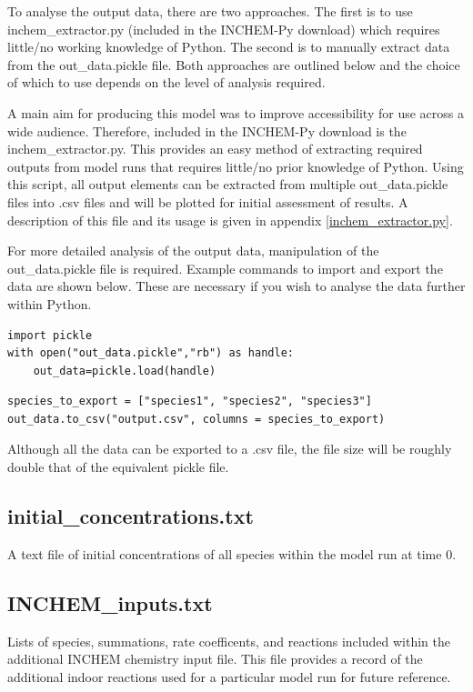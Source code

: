 \documentclass[a4paper]{refart}
\begin{document}
To analyse the output data, there are two approaches. The first is to use inchem\_extractor.py (included in the INCHEM-Py download) which requires little/no working knowledge of Python. The second is to manually extract data from the out\_data.pickle file. Both approaches are outlined below and the choice of which to use depends on the level of analysis required.


A main aim for producing this model was to improve accessibility for use across a wide audience. Therefore, included in the INCHEM-Py download is the inchem\_extractor.py. This provides an easy method of extracting required outputs from model runs that requires little/no prior knowledge of Python. Using this script, all output elements can be extracted from multiple out\_data.pickle files into .csv files and will be plotted for initial assessment of results. A description of this file and its usage is given in appendix \ref{inchem_extractor.py}. 


For more detailed analysis of the output data, manipulation of the out\_data.pickle file is required. Example commands to import and export the data are shown below. These are necessary if you wish to analyse the data further within Python.

\begin{verbatim}
import pickle
with open("out_data.pickle","rb") as handle:
    out_data=pickle.load(handle)
\end{verbatim}

\begin{verbatim}
species_to_export = ["species1", "species2", "species3"]
out_data.to_csv("output.csv", columns = species_to_export)
\end{verbatim}
Although all the data can be exported to a .csv file, the file size will be roughly double that of the equivalent pickle file. 

\subsection{initial\_concentrations.txt}
A text file of initial concentrations of all species within the model run at time 0.

\subsection{INCHEM\_inputs.txt}
Lists of species, summations, rate coefficents, and reactions included within the additional INCHEM chemistry input file. This file provides a record of the additional indoor reactions used for a particular model run for future reference.
\end{document}
